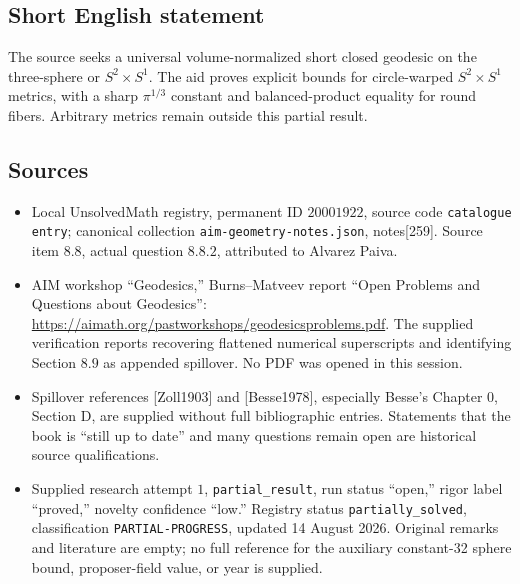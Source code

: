 \documentclass[11pt]{article}
\begin{document}
\subsection{Short English statement}
The source seeks a universal volume-normalized short closed geodesic on the three-sphere or \(S^2\times S^1\). The aid proves explicit bounds for circle-warped \(S^2\times S^1\) metrics, with a sharp \(\pi^{1/3}\) constant and balanced-product equality for round fibers. Arbitrary metrics remain outside this partial result.
\subsection{Sources}
\begin{itemize}
\item Local UnsolvedMath registry, permanent ID \(20001922\), source code \texttt{catalogue entry}; canonical collection \texttt{aim-geometry-notes.json}, notes[259]. Source item \(8.8\), actual question \(8.8.2\), attributed to Alvarez Paiva.
\item AIM workshop ``Geodesics,'' Burns--Matveev report ``Open Problems and Questions about Geodesics'': \url{https://aimath.org/pastworkshops/geodesicsproblems.pdf}. The supplied verification reports recovering flattened numerical superscripts and identifying Section \(8.9\) as appended spillover. No PDF was opened in this session.
\item Spillover references [Zoll1903] and [Besse1978], especially Besse's Chapter \(0\), Section D, are supplied without full bibliographic entries. Statements that the book is ``still up to date'' and many questions remain open are historical source qualifications.
\item Supplied research attempt \(1\), \texttt{partial\_result}, run status ``open,'' rigor label ``proved,'' novelty confidence ``low.'' Registry status \texttt{partially\_solved}, classification \texttt{PARTIAL-PROGRESS}, updated 14 August 2026. Original remarks and literature are empty; no full reference for the auxiliary constant-32 sphere bound, proposer-field value, or year is supplied.
\end{itemize}
\end{document}
